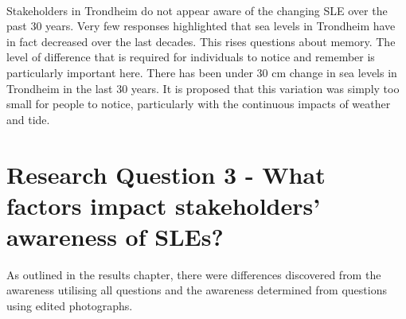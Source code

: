 \paragraph{}
Stakeholders in Trondheim do not appear aware of the changing SLE over the past 30 years. Very few responses highlighted that sea levels in Trondheim have in fact decreased over the last decades. This rises questions about memory. The level of difference that is required for individuals to notice and remember is particularly important here. There has been under 30 cm change in sea levels in Trondheim in the last 30 years. It is proposed that this variation was simply too small for people to notice, particularly with the continuous impacts of weather and tide. 
\paragraph{}

\section{Research Question 3 - What factors impact stakeholders' awareness of SLEs? }
 As outlined in the results chapter, there were differences discovered from the awareness utilising all questions and the awareness determined from questions using edited photographs. 
\paragraph{}

